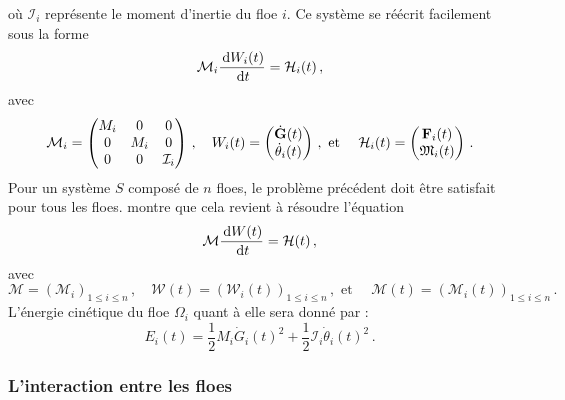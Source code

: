 où $\mathcal{I}_i$ représente le moment d'inertie du floe $i$. Ce système se réécrit facilement sous la forme 
\begin{align}    
    \mathcal{M}_i \frac{\diff W_i(t)}{\diff t} = \mathcal{H}_i(t) \,,
\end{align}
avec 
$$
\mathcal{M}_i = 
\begin{pmatrix}
    M_i & 0 & 0 \\ 0 & M_i & 0 \\ 0 & 0 & \mathcal{I}_i
\end{pmatrix} \,, \quad
W_i(t) = 
\begin{pmatrix}
    \dot{\bm{\mathrm{G}}}(t) \\ \dot{\theta}_i(t)
\end{pmatrix} \,,
\text{ et } \quad \mathcal{H}_i(t) = 
\begin{pmatrix}
    \bm{\mathrm{F}}_i(t) \\ \mathfrak{M}_i(t)
\end{pmatrix} \,.
$$
Pour un système $S$ composé de $n$ floes, le problème précédent doit être satisfait pour tous les floes. \parencite[p.18]{rabatel2015thesis} montre que cela revient à résoudre l'équation
\begin{align} \label{eq:bilan1}
    \mathcal{M} \frac{\diff W(t)}{\diff t} = \mathcal{H}(t) \,,
\end{align}
avec 
$$
\mathcal{M} = (\mathcal{M}_i)_{1\leq i \leq n } \,, \quad
\mathcal{W}(t) = (\mathcal{W}_i(t))_{1\leq i \leq n } \,, \text{ et } \quad
\mathcal{M}(t) = (\mathcal{M}_i(t))_{1\leq i \leq n }  \,.
$$
L'énergie cinétique du floe $\Omega_i$ quant à elle sera donné par :
$$
E_i(t) = \frac{1}{2}M_i \dot{G}_i(t)^2 + \frac{1}{2}\mathcal{I}_i \dot{\theta}_i(t)^2 \,. 
$$ 


\subsubsection{L'interaction entre les floes}


